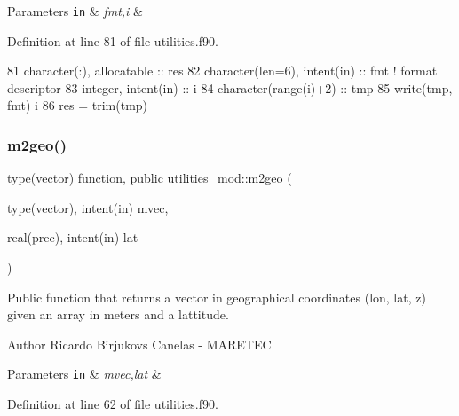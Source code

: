 \begin{DoxyParams}[1]{Parameters}
\mbox{\tt in}  & {\em fmt,i} & \\
\hline
\end{DoxyParams}


Definition at line 81 of file utilities.\+f90.


\begin{DoxyCode}
81     \textcolor{keywordtype}{character(:)}, \textcolor{keywordtype}{allocatable} :: res
82     \textcolor{keywordtype}{character(len=6)}, \textcolor{keywordtype}{intent(in)} :: fmt \textcolor{comment}{! format descriptor}
83     \textcolor{keywordtype}{integer}, \textcolor{keywordtype}{intent(in)} :: i
84     \textcolor{keywordtype}{character(range(i)+2)} :: tmp    
85     \textcolor{keyword}{write}(tmp, fmt) i
86     res = trim(tmp)
\end{DoxyCode}
\mbox{\label{namespaceutilities__mod_ac4f9ec7e3dc3683a4e79e462d89a90b9}} 
\subsubsection{\texorpdfstring{m2geo()}{m2geo()}}
{\footnotesize\ttfamily type(vector) function, public utilities\+\_\+mod\+::m2geo (\begin{DoxyParamCaption}\item[{type(vector), intent(in)}]{mvec,  }\item[{real(prec), intent(in)}]{lat }\end{DoxyParamCaption})}



Public function that returns a vector in geographical coordinates (lon, lat, z) given an array in meters and a lattitude. 

\begin{DoxyAuthor}{Author}
Ricardo Birjukovs Canelas -\/ M\+A\+R\+E\+T\+EC 
\end{DoxyAuthor}

\begin{DoxyParams}[1]{Parameters}
\mbox{\tt in}  & {\em mvec,lat} & \\
\hline
\end{DoxyParams}


Definition at line 62 of file utilities.\+f90.


